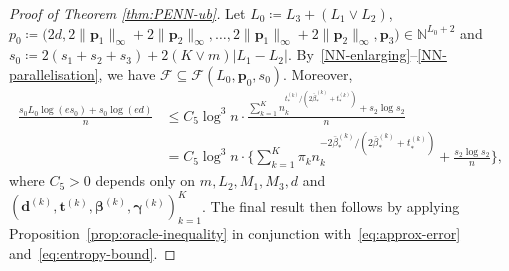 \documentclass[12pt]{article}
\newcommand{\blue}[1]{\textcolor{blue}{#1}}
\begin{document}
\begin{proof}[Proof of Theorem \ref{thm:PENN-ub}]
    Let $L_0 \coloneqq L_3+(L_1 \vee L_2)$, $p_0 \coloneqq \bigl(2d, 2\|\bm{p}_1\|_{\infty} + 2\|\bm{p}_2\|_{\infty}, \ldots, 2\|\bm{p}_1\|_{\infty} + 2\|\bm{p}_2\|_{\infty}, \bm{p}_3\bigr) \in \mathbb{N}^{L_0+2}$ and $s_0 \coloneqq 2(s_1+s_2+s_3) + 2(K \vee m)|L_1 - L_2|$. By~\ref{NN-enlarging}--\ref{NN-parallelisation}, we have $\mathcal{F}\subseteq \mathcal{F}(L_0, \bm{p}_0, s_0)$. Moreover, \begin{align}
        \frac{s_0L_0\log(es_0) + s_0\log(ed)}{n}
        & \leq C_5 \log^3 n \cdot \frac{\sum_{k=1}^K n_k^{t_*^{(k)} / (2\bar{\beta}_*^{(k)} + t_*^{(k)})} + s_2\log s_2}{n}\nonumber\\
        &= C_5\log^3 n \cdot  \biggl\{\sum_{k=1}^K \pi_k n_k^{-2\bar\beta^{(k)}_*/(2\bar\beta^{(k)}_* + t^{(k)}_*)} + \frac{s_2 \log s_2}{n}\biggr\}, \label{eq:entropy-bound}
    \end{align}
    where $C_5>0$ depends only on $m,L_2,M_1,M_3,d$ and $(\bm d^{(k)}, \bm t^{(k)}, \bm\beta^{(k)}, \bm\gamma^{(k)})_{k=1}^K$. The final result then follows by applying Proposition~\ref{prop:oracle-inequality} in conjunction with~\eqref{eq:approx-error} and~\eqref{eq:entropy-bound}.  
\end{proof}
\end{document}
